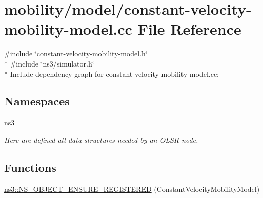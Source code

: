 \hypertarget{constant-velocity-mobility-model_8cc}{}\section{mobility/model/constant-\/velocity-\/mobility-\/model.cc File Reference}
\label{constant-velocity-mobility-model_8cc}
{\ttfamily \#include \char`\"{}constant-\/velocity-\/mobility-\/model.\+h\char`\"{}}\\*
{\ttfamily \#include \char`\"{}ns3/simulator.\+h\char`\"{}}\\*
Include dependency graph for constant-\/velocity-\/mobility-\/model.cc\+:
\subsection*{Namespaces}
\begin{DoxyCompactItemize}
\item 
 \hyperlink{namespacens3}{ns3}
\begin{DoxyCompactList}\small\item\em Here are defined all data structures needed by an O\+L\+SR node. \end{DoxyCompactList}\end{DoxyCompactItemize}
\subsection*{Functions}
\begin{DoxyCompactItemize}
\item 
\hyperlink{namespacens3_a0dc34316c85c78d631431e83892bdb94}{ns3\+::\+N\+S\+\_\+\+O\+B\+J\+E\+C\+T\+\_\+\+E\+N\+S\+U\+R\+E\+\_\+\+R\+E\+G\+I\+S\+T\+E\+R\+ED} (Constant\+Velocity\+Mobility\+Model)
\end{DoxyCompactItemize}
